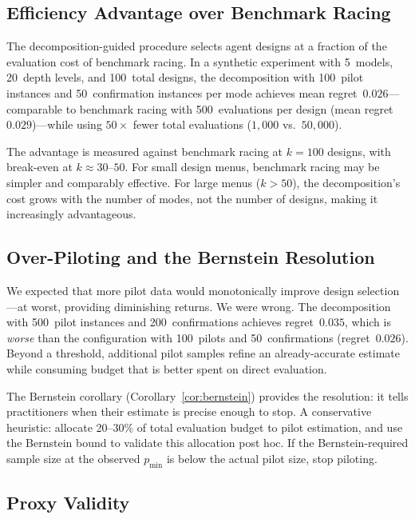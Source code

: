 \documentclass[twoside,11pt]{article}
\newcommand{\pmin}{p_{\min}}
\begin{document}
\subsection{Efficiency Advantage over Benchmark Racing}
\label{sec:efficiency}

The decomposition-guided procedure selects agent designs at a fraction of the evaluation cost of benchmark racing.
In a synthetic experiment with 5~models, 20~depth levels, and 100~total designs, the decomposition with 100~pilot instances and 50~confirmation instances per mode achieves mean regret~$0.026$---comparable to benchmark racing with 500~evaluations per design (mean regret~$0.029$)---while using $50\times$ fewer total evaluations ($1{,}000$ vs.\ $50{,}000$).

The advantage is measured against benchmark racing at $k = 100$ designs, with break-even at $k \approx 30\text{--}50$.
For small design menus, benchmark racing may be simpler and comparably effective.
For large menus ($k > 50$), the decomposition's cost grows with the number of modes, not the number of designs, making it increasingly advantageous.

\subsection{Over-Piloting and the Bernstein Resolution}
\label{sec:over-piloting}

We expected that more pilot data would monotonically improve design selection---at worst, providing diminishing returns.
We were wrong.
The decomposition with 500~pilot instances and 200~confirmations achieves regret~$0.035$, which is \emph{worse} than the configuration with 100~pilots and 50~confirmations (regret~$0.026$).
Beyond a threshold, additional pilot samples refine an already-accurate estimate while consuming budget that is better spent on direct evaluation.

The Bernstein corollary (Corollary~\ref{cor:bernstein}) provides the resolution: it tells practitioners when their estimate is precise enough to stop.
A conservative heuristic: allocate 20--30\% of total evaluation budget to pilot estimation, and use the Bernstein bound to validate this allocation post hoc.
If the Bernstein-required sample size at the observed $\pmin$ is below the actual pilot size, stop piloting.

\subsection{Proxy Validity}
\label{sec:proxy-validity}
\end{document}
